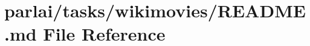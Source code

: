 \hypertarget{parlai_2tasks_2wikimovies_2README_8md}{}\section{parlai/tasks/wikimovies/\+R\+E\+A\+D\+ME.md File Reference}
\label{parlai_2tasks_2wikimovies_2README_8md}
